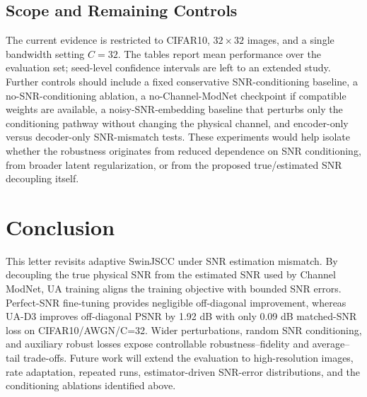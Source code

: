 \documentclass[10pt,journal]{IEEEtran}
\begin{document}
\subsection{Scope and Remaining Controls}

The current evidence is restricted to CIFAR10, $32\times32$ images, and a single bandwidth setting $C=32$. The tables report mean performance over the evaluation set; seed-level confidence intervals are left to an extended study. Further controls should include a fixed conservative SNR-conditioning baseline, a no-SNR-conditioning ablation, a no-Channel-ModNet checkpoint if compatible weights are available, a noisy-SNR-embedding baseline that perturbs only the conditioning pathway without changing the physical channel, and encoder-only versus decoder-only SNR-mismatch tests. These experiments would help isolate whether the robustness originates from reduced dependence on SNR conditioning, from broader latent regularization, or from the proposed true/estimated SNR decoupling itself.

\section{Conclusion}

This letter revisits adaptive SwinJSCC under SNR estimation mismatch. By decoupling the true physical SNR from the estimated SNR used by Channel ModNet, UA training aligns the training objective with bounded SNR errors. Perfect-SNR fine-tuning provides negligible off-diagonal improvement, whereas UA-D3 improves off-diagonal PSNR by 1.92 dB with only 0.09 dB matched-SNR loss on CIFAR10/AWGN/C=32. Wider perturbations, random SNR conditioning, and auxiliary robust losses expose controllable robustness--fidelity and average--tail trade-offs. Future work will extend the evaluation to high-resolution images, rate adaptation, repeated runs, estimator-driven SNR-error distributions, and the conditioning ablations identified above.



\end{document}
